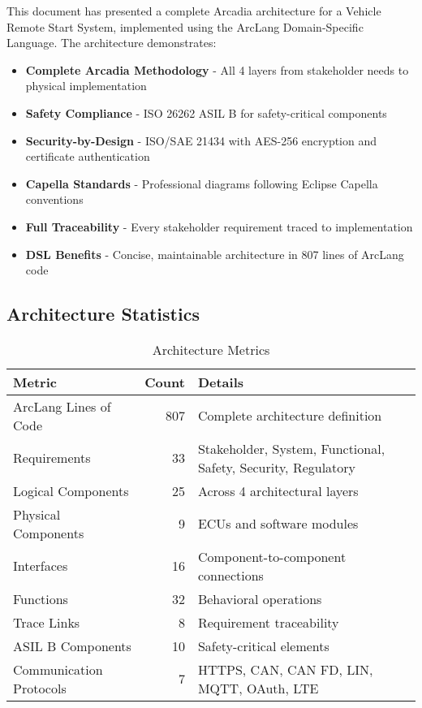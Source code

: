 \documentclass[11pt,a4paper]{article}
\begin{document}
This document has presented a complete Arcadia architecture for a Vehicle Remote Start System, implemented using the ArcLang Domain-Specific Language. The architecture demonstrates:

\begin{itemize}[leftmargin=*]
    \item \textbf{Complete Arcadia Methodology} - All 4 layers from stakeholder needs to physical implementation
    \item \textbf{Safety Compliance} - ISO 26262 ASIL B for safety-critical components
    \item \textbf{Security-by-Design} - ISO/SAE 21434 with AES-256 encryption and certificate authentication
    \item \textbf{Capella Standards} - Professional diagrams following Eclipse Capella conventions
    \item \textbf{Full Traceability} - Every stakeholder requirement traced to implementation
    \item \textbf{DSL Benefits} - Concise, maintainable architecture in 807 lines of ArcLang code
\end{itemize}

\subsection{Architecture Statistics}

\begin{table}[htbp]
\centering
\caption{Architecture Metrics}
\label{tab:metrics}
\begin{tabular}{|l|r|l|}
\hline
\textbf{Metric} & \textbf{Count} & \textbf{Details} \\
\hline
ArcLang Lines of Code & 807 & Complete architecture definition \\
\hline
Requirements & 33 & Stakeholder, System, Functional, Safety, Security, Regulatory \\
\hline
Logical Components & 25 & Across 4 architectural layers \\
\hline
Physical Components & 9 & ECUs and software modules \\
\hline
Interfaces & 16 & Component-to-component connections \\
\hline
Functions & 32 & Behavioral operations \\
\hline
Trace Links & 8 & Requirement traceability \\
\hline
ASIL B Components & 10 & Safety-critical elements \\
\hline
Communication Protocols & 7 & HTTPS, CAN, CAN FD, LIN, MQTT, OAuth, LTE \\
\hline
\end{tabular}
\end{table}
\end{document}
